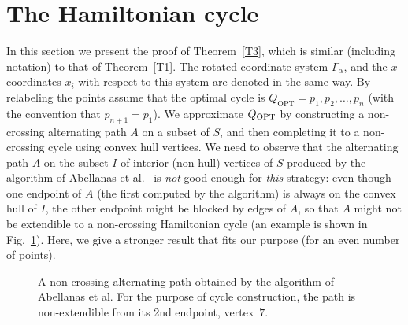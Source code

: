 \documentclass[proceedings]{stacs}
\begin{document}
\section{The Hamiltonian cycle} \label{sec:cycle}

In this section we present the proof of Theorem~\ref{T3}, which is similar
(including notation) to that of Theorem~\ref{T1}.
The rotated coordinate system $\Gamma_\alpha$, and the $x$-coordinates
$x_i$ with respect to this system are denoted in the same way.
By relabeling the points assume that the optimal cycle is
$Q_\textrm{OPT} = p_1,p_2,\ldots,p_n$ (with the convention that $p_{n+1}=p_1$).
We approximate $Q_{\rm OPT}$ by constructing a non-crossing alternating path $A$
on a subset of $S$, and then completing it to a non-crossing cycle using
convex hull vertices. We need to observe that the alternating path $A$ on the
subset $I$ of interior (non-hull) vertices of $S$ produced by the algorithm of
Abellanas et al.~\cite{AGH+99} is {\em not} good enough for {\em this} strategy:
even though one endpoint of $A$ (the first computed by the algorithm) is
always on the convex hull of $I$, the other endpoint might be blocked by edges
of $A$, so that $A$ might not be extendible to a non-crossing Hamiltonian cycle
(an example is shown in Fig.~\ref{abell}). Here, we give a stronger result
that fits our purpose (for an even number of points).
\begin{figure} [htb]
\centerline{\epsfxsize=2in }
\caption{\small A non-crossing alternating path obtained by the algorithm of
  Abellanas et al. For the purpose of cycle construction, the path
is non-extendible from its 2nd endpoint, vertex~$7$.}
\label{abell}
\end{figure}
\end{document}

